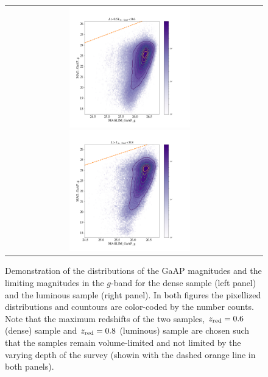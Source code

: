\documentclass[fleqn,usenatbib,useAMS]{mnras}
\begin{document}
\begin{figure}
 
 \begin{tabular}{cc}
\includegraphics[width=0.5\textwidth]{figures_tmp/magg_lim_type_dense_zmax_0_6.png}
\includegraphics[width=0.5\textwidth]{figures_tmp/magg_lim_type_lum_zmax_0_8.png}
\end{tabular}
\caption{\label{fig:maglim_g} Demonstration of the distributions of the GaAP magnitudes and the limiting magnitudes in the $g$-band for the dense sample (left panel) and the luminous sample (right panel). In both figures the pixellized distributions and countours are color-coded by the number counts. Note that the maximum redshifts of the two samples, $z_{\rm red}=0.6$ (dense) sample and $z_{\rm red}=0.8$ (luminous) sample are chosen such that the samples remain volume-limited and not limited by the varying depth of the survey (showin with the dashed orange line in both panels).} 
\end{figure}
\end{document}
